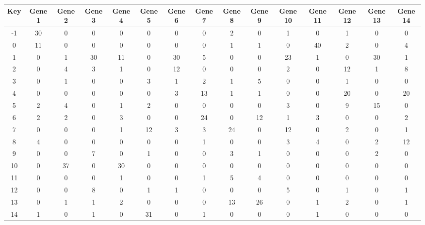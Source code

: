 \begin{tabular}{|c|c|c|c|c|c|c|c|c|c|c|c|c|c|c|}
\hline
Key & Gene 1 & Gene 2 & Gene 3 & Gene 4 & Gene 5 & Gene 6 & Gene 7 & Gene 8 & Gene 9 & Gene 10 & Gene 11 & Gene 12 & Gene 13 & Gene 14 \\
\hline
-1 & 30 & 0 & 0 & 0 & 0 & 0 & 0 & 2 & 0 & 1 & 0 & 1 & 0 & 0 \\
0 & 11 & 0 & 0 & 0 & 0 & 0 & 0 & 1 & 1 & 0 & 40 & 2 & 0 & 4 \\
1 & 0 & 1 & 30 & 11 & 0 & 30 & 5 & 0 & 0 & 23 & 1 & 0 & 30 & 1 \\
2 & 0 & 4 & 3 & 1 & 0 & 12 & 0 & 0 & 0 & 2 & 0 & 12 & 1 & 8 \\
3 & 0 & 1 & 0 & 0 & 3 & 1 & 2 & 1 & 5 & 0 & 0 & 1 & 0 & 0 \\
4 & 0 & 0 & 0 & 0 & 0 & 3 & 13 & 1 & 1 & 0 & 0 & 20 & 0 & 20 \\
5 & 2 & 4 & 0 & 1 & 2 & 0 & 0 & 0 & 0 & 3 & 0 & 9 & 15 & 0 \\
6 & 2 & 2 & 0 & 3 & 0 & 0 & 24 & 0 & 12 & 1 & 3 & 0 & 0 & 2 \\
7 & 0 & 0 & 0 & 1 & 12 & 3 & 3 & 24 & 0 & 12 & 0 & 2 & 0 & 1 \\
8 & 4 & 0 & 0 & 0 & 0 & 0 & 1 & 0 & 0 & 3 & 4 & 0 & 2 & 12 \\
9 & 0 & 0 & 7 & 0 & 1 & 0 & 0 & 3 & 1 & 0 & 0 & 0 & 2 & 0 \\
10 & 0 & 37 & 0 & 30 & 0 & 0 & 0 & 0 & 0 & 0 & 0 & 0 & 0 & 0 \\
11 & 0 & 0 & 0 & 1 & 0 & 0 & 1 & 5 & 4 & 0 & 0 & 0 & 0 & 0 \\
12 & 0 & 0 & 8 & 0 & 1 & 1 & 0 & 0 & 0 & 5 & 0 & 1 & 0 & 1 \\
13 & 0 & 1 & 1 & 2 & 0 & 0 & 0 & 13 & 26 & 0 & 1 & 2 & 0 & 1 \\
14 & 1 & 0 & 1 & 0 & 31 & 0 & 1 & 0 & 0 & 0 & 1 & 0 & 0 & 0 \\
\hline
\end{tabular}